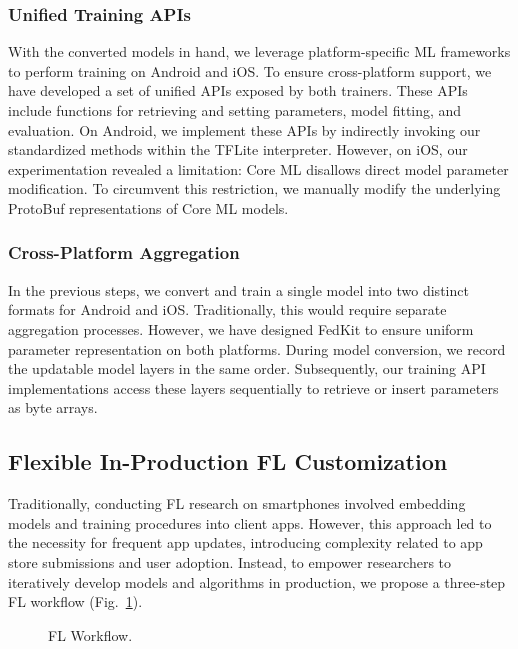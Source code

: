 \documentclass[letterpaper]{article} %
\begin{document}
\subsubsection{Unified Training APIs}
With the converted models in hand,
we leverage platform-specific ML frameworks to
perform training on Android and iOS.
To ensure cross-platform support,
we have developed a set of unified APIs exposed by both trainers.
These APIs include functions for retrieving and setting parameters,
model fitting, and evaluation.
On Android, we implement these APIs by indirectly invoking
our standardized methods within the TFLite interpreter.
However, on iOS, our experimentation revealed a limitation:
Core ML disallows direct model parameter modification.
To circumvent this restriction,
we manually modify the underlying ProtoBuf representations of Core ML models.

\subsubsection{Cross-Platform Aggregation}
In the previous steps,
we convert and train a single model into two distinct formats for
Android and iOS.
Traditionally, this would require separate aggregation processes.
However, we have designed FedKit to ensure uniform parameter representation
on both platforms.
During model conversion,
we record the updatable model layers in the same order.
Subsequently,
our training API implementations access these layers sequentially to
retrieve or insert parameters as byte arrays.

\subsection{Flexible In-Production FL Customization}
\newcommand{\model}{$M$}
\newcommand{\fs}{$S_\mathrm F$}
Traditionally, conducting FL research on smartphones involved
embedding models and training procedures into client apps.
However, this approach led to the necessity for frequent app updates,
introducing complexity related to app store submissions and user adoption.
Instead,
to empower researchers to iteratively develop models and algorithms
in production, we propose a three-step FL workflow
(Fig.~\ref{fig:fl-workflow}).
\begin{figure}
    \centering
    \caption{FL Workflow.}
    \label{fig:fl-workflow}
\end{figure}
\end{document}

